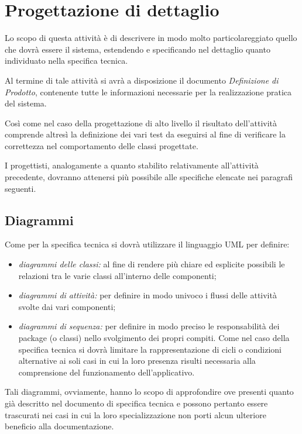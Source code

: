 {\section{Progettazione di dettaglio}
Lo scopo di questa attività è di descrivere in modo molto particolareggiato quello che dovrà essere il sistema, estendendo e specificando nel dettaglio quanto individuato nella specifica tecnica.

Al termine di tale attività si avrà a disposizione il documento \textit{Definizione di Prodotto}, contenente tutte le informazioni necessarie per la realizzazione pratica del sistema.

Così come nel caso della progettazione di alto livello il risultato dell'attività comprende altresì la definizione dei vari test da eseguirsi al fine di verificare la correttezza nel comportamento delle classi progettate.

I progettisti, analogamente a quanto stabilito relativamente all'attività precedente, dovranno attenersi più possibile alle specifiche elencate nei paragrafi seguenti.

\subsection{Diagrammi}
Come per la specifica tecnica si dovrà utilizzare il linguaggio UML per definire:

\begin{itemize}
\item \textit{diagrammi delle classi:} al fine di rendere più chiare ed esplicite possibili le relazioni tra le varie classi all'interno delle componenti;
\item \textit{diagrammi di attività:} per definire in modo univoco i flussi delle attività svolte dai vari componenti;
\item \textit{diagrammi di sequenza:} per definire in modo preciso le responsabilità dei package (o classi) nello svolgimento dei propri compiti. Come nel caso della specifica tecnica si dovrà limitare la rappresentazione di cicli o condizioni alternative ai soli casi in cui la loro presenza risulti necessaria alla comprensione del funzionamento dell'applicativo.
\end{itemize}

Tali diagrammi, ovviamente, hanno lo scopo di approfondire ove presenti quanto già descritto nel documento di specifica tecnica e possono pertanto essere trascurati nei casi in cui la loro specializzazione non porti alcun ulteriore beneficio alla documentazione.

}
